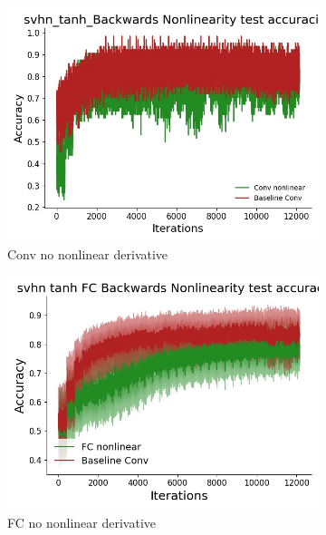 \begin{figure}[htb]
\medskip
\begin{subfigure}{0.25\textwidth}
  \includegraphics[width=\linewidth]{chapter_6_figures/AR/svhn_tanh_Backwards_Nonlinearity_test_accuracies_prelim_1.jpg}
  \caption{Conv no nonlinear derivative}
\end{subfigure}\hfil %
\begin{subfigure}{0.25\textwidth}
  \includegraphics[width=\linewidth]{chapter_6_figures/AR/svhn_tanh_FC_Backwards_Nonlinearity_test_accuracies_prelim_1.jpg}
  \caption{FC no nonlinear derivative}
\end{subfigure}\hfil %
\begin{subfigure}{0.25\textwidth}

\end{subfigure}
\end{figure}
